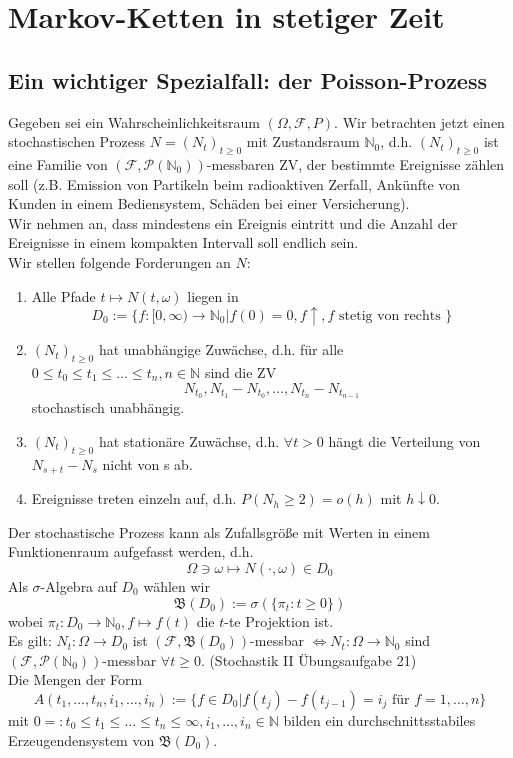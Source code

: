 \documentclass[a4paper,twoside,DIV15,BCOR12mm]{scrbook}
\newcommand{\cF}{\mathcal F}
\newcommand{\borel}{{\mathfrak B}}
\begin{document}
\chapter{Markov-Ketten in stetiger Zeit}

\section{Ein wichtiger Spezialfall: der Poisson-Prozess}

Gegeben sei ein Wahrscheinlichkeitsraum $(\Omega,\cF,P)$.
Wir betrachten jetzt einen stochastischen Prozess $N=(N_t)_{t\geq 0}$
mit Zustandsraum $\mathbb{N}_0$, d.h. $(N_t)_{t\geq 0}$ ist eine Familie von
$(\cF,\mathcal{P}(\mathbb{N}_0))$-messbaren ZV, der bestimmte Ereignisse zählen soll
(z.B. Emission von Partikeln beim radioaktiven Zerfall, Ankünfte von Kunden in einem
Bediensystem, Schäden bei einer Versicherung). \\
Wir nehmen an, dass mindestens ein Ereignis eintritt und die Anzahl der Ereignisse in einem
kompakten Intervall soll endlich sein. \\
Wir stellen folgende Forderungen an $N$:
\begin{enumerate}[\hspace{1em}{(A}1)]
\item Alle Pfade $t \mapsto N(t,\omega)$ liegen in
\[
D_0:=\{f:[0,\infty)\longrightarrow\mathbb{N}_0\vert f(0)=0,f\uparrow,f \text{ stetig von rechts }\}
\]
\item $(N_t)_{t\geq 0}$ hat unabhängige Zuwächse, d.h. für alle 
$0\leq t_0\leq t_1 \leq \dots \leq t_n, n\in \mathbb{N}$ sind die ZV
\[
N_{t_0},N_{t_1}-N_{t_0},\dots,N_{t_n}-N_{t_{n-1}}
\]
stochastisch unabhängig.
\item $(N_t)_{t\geq 0}$ hat stationäre Zuwächse, d.h. $\forall t>0$ hängt die Verteilung
von $N_{s+t}-N_s$ nicht von s ab.
\item Ereignisse treten einzeln auf, d.h. $P(N_h\geq2)=o(h)$ mit $h\downarrow 0$.
\end{enumerate}
\begin{bemerkung}
  Der stochastische Prozess kann als Zufallsgröße mit Werten in einem
  Funktionenraum aufgefasst werden, d.h.
  \[
  \Omega\ni\omega\mapsto N(\cdot,\omega)\in D_0
  \]
  Als $\sigma$-Algebra auf $D_0$ wählen wir 
  \[
  \borel(D_0):=\sigma(\{\pi_t:t\geq 0\})
  \]
  wobei $\pi_t:D_0\longrightarrow\mathbb{N}_0,f\mapsto f(t)$ die $t$-te Projektion ist. \\
  Es gilt: $N_t:\Omega\longrightarrow D_0$ ist $(\cF,\borel(D_0))$-messbar 
  $\Longleftrightarrow N_t:\Omega\longrightarrow\mathbb{N}_0$ sind 
  $(\cF,\mathcal P(\mathbb N_0))$-messbar $\forall t\geq0$. 
  (Stochastik II Übungsaufgabe 21) \\
  Die Mengen der Form
  \[
  A(t_1,\dots,t_n,i_1,\dots,i_n):=\{f\in D_0\vert f(t_j)-f(t_{j-1})=i_j \text{ für } f=1,\dots,n\}
  \]
  mit $0=:t_0\leq t_1\leq\dots\leq t_n\leq\infty,i_1,\dots,i_n\in\mathbb N$ 
  bilden ein durchschnittsstabiles Erzeugendensystem von $\borel(D_0)$.
\end{bemerkung}
\end{document}
